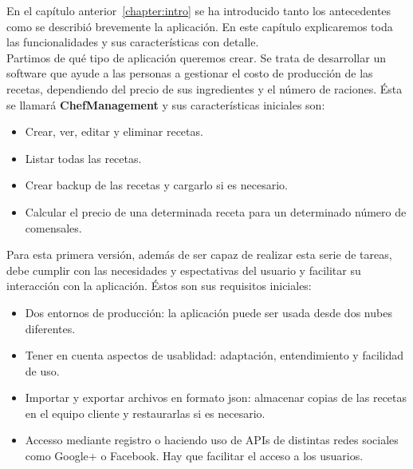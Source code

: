 %

En el capítulo anterior~\ref{chapter:intro} se ha introducido tanto los antecedentes como se describió brevemente la aplicación. En este capítulo explicaremos toda las funcionalidades y sus características con detalle. \\

Partimos de qué tipo de aplicación queremos crear. Se trata de desarrollar un software que ayude a las personas a gestionar el costo de producción de las recetas, dependiendo del precio de sus ingredientes y el número de raciones. Ésta se llamará \textbf{ChefManagement} y sus características iniciales son:
\begin{itemize}
	\item Crear, ver, editar y eliminar recetas.
	\item Listar todas las recetas.
	\item Crear backup de las recetas y cargarlo si es necesario.
	\item Calcular el precio de una determinada receta para un determinado número de comensales.
\end{itemize}

Para esta primera versión, además de ser capaz de realizar esta serie de tareas, debe  cumplir con las necesidades y espectativas del usuario y facilitar su interacción con la aplicación. Éstos son sus requisitos iniciales:
\begin{itemize}
	\item Dos entornos de producción: la aplicación puede ser usada desde dos nubes diferentes.
	\item Tener en cuenta aspectos de usablidad: adaptación, entendimiento y facilidad de uso.
	\item Importar y exportar archivos en formato json: almacenar copias de las recetas en el equipo cliente y restaurarlas si es necesario.
	\item Accesso mediante registro o haciendo uso de APIs de distintas redes sociales como Google+ o Facebook. Hay que facilitar el acceso a los usuarios.
\end{itemize}

